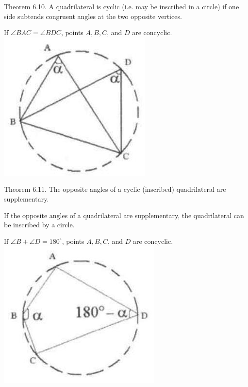 \documentclass[10pt]{article}
\begin{document}
Theorem 6.10. A quadrilateral is cyclic (i.e. may be inscribed in a circle) if one side subtends congruent angles at the two opposite vertices.

If \(\angle B A C=\angle B D C\), points \(A, B, C\), and \(D\) are concyclic.\\
\includegraphics[max width=\textwidth, center]{2025_04_17_97bc1f7e44d93c271a88g-191(2)}

Theorem 6.11. The opposite angles of a cyclic (inscribed) quadrilateral are supplementary.

If the opposite angles of a quadrilateral are supplementary, the quadrilateral can be inscribed by a circle.

If \(\angle B+\angle D=180^{\circ}\), points \(A, B, C\), and \(D\) are concyclic.\\
\includegraphics[max width=\textwidth, center]{2025_04_17_97bc1f7e44d93c271a88g-191(1)}
\end{document}
